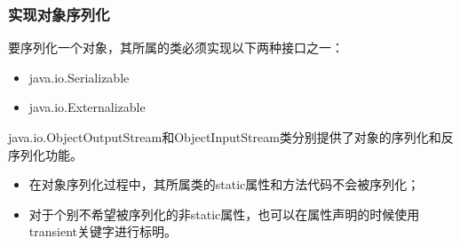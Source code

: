 \begin{frame}[fragile] %
\frametitle{实现对象序列化}

要序列化一个对象，其所属的类必须实现以下两种接口之一：

\begin{itemize}
\item java.io.Serializable
\item java.io.Externalizable
\end{itemize}

java.io.ObjectOutputStream和ObjectInputStream类分别提供了对象的序列化和反序列化功能。


\begin{itemize}\kai
\item 在对象序列化过程中，其所属类的static属性和方法代码不会被序列化；
\item 对于个别不希望被序列化的非static属性，也可以在属性声明的时候使用transient关键字进行标明。
\end{itemize}


\end{frame}

